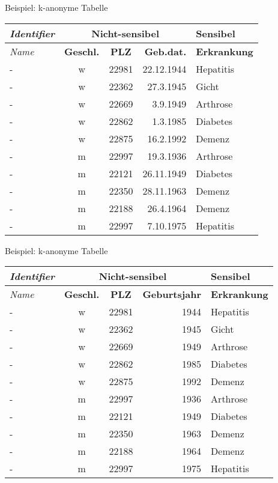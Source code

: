 \begin{frame}{Beispiel: k-anonyme Tabelle}
	\begin{center}
		\begin{tabular}{|l|c|c|r|l|}
		\hline \textit{Identifier} & \multicolumn{3}{c|}{\textbf{Nicht-sensibel}} & \textbf{Sensibel} \\ 
		\hline \textit{Name} & \textbf{Geschl.} & \textbf{PLZ} & \textbf{Geb.dat.} & \textbf{Erkrankung} \\
		\hline \hline - & w & 22981 & 22.12.1944 & Hepatitis \\ 
		\hline - & w & 22362 & 27.3.1945 & Gicht \\
		\hline - & w & 22669 & 3.9.1949 & Arthrose \\ 
		\hline - & w & 22862 & 1.3.1985 & Diabetes \\ 
		\hline - & w & 22875 & 16.2.1992 & Demenz \\  
		\hline - & m & 22997 & 19.3.1936 & Arthrose \\ 
		\hline - & m & 22121 & 26.11.1949 & Diabetes \\ 
		\hline - & m & 22350 & 28.11.1963 & Demenz \\ 
		\hline - & m & 22188 & 26.4.1964 & Demenz \\ 
		\hline - & m & 22997 & 7.10.1975 & Hepatitis \\ 
		\hline 
		\end{tabular}
	\end{center}
\end{frame}

\begin{frame}{Beispiel: k-anonyme Tabelle}
	\begin{center}
		\begin{tabular}{|l|c|c|r|l|}
		\hline \textit{Identifier} & \multicolumn{3}{c|}{\textbf{Nicht-sensibel}} & \textbf{Sensibel} \\ 
		\hline \textit{Name} & \textbf{Geschl.} & \textbf{PLZ} & \textbf{Geburtsjahr} & \textbf{Erkrankung} \\ \hline
		\hline - & w & 22981 & 1944 & Hepatitis \\ 
		\hline - & w & 22362 & 1945 & Gicht \\
		\hline - & w & 22669 & 1949 & Arthrose \\ 
		\hline - & w & 22862 & 1985 & Diabetes \\ 
		\hline - & w & 22875 & 1992 & Demenz \\  
		\hline - & m & 22997 & 1936 & Arthrose \\ 
		\hline - & m & 22121 & 1949 & Diabetes \\ 
		\hline - & m & 22350 & 1963 & Demenz \\ 
		\hline - & m & 22188 & 1964 & Demenz \\ 
		\hline - & m & 22997 & 1975 & Hepatitis \\ 
		\hline 
		\end{tabular}
	\end{center}
\end{frame}

